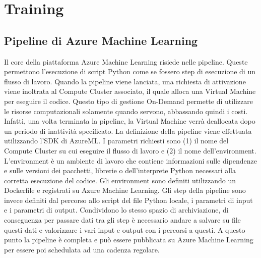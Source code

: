 \section{Training}
\subsection{Pipeline di Azure Machine Learning}
Il core della piattaforma Azure Machine Learning risiede nelle pipeline. Queste permettono l'esecuzione di script Python come se fossero step di esecuzione di un flusso di lavoro. Quando la pipeline viene lanciata, una richiesta di attivazione viene inoltrata al Compute Cluster associato, il quale alloca una Virtual Machine per eseguire il codice. Questo tipo di gestione On-Demand permette di utilizzare le risorse computazionali solamente quando servono, abbassando quindi i costi. Infatti, una volta terminata la pipeline, la Virtual Machine verrà deallocata dopo un periodo di inattività specificato.
La definizione della pipeline viene effettuata utilizzando l'SDK di AzureML. 
I parametri richiesti sono (1) il nome del Compute Cluster su cui eseguire il flusso di lavoro e (2) il nome dell'environment. L'environment è un ambiente di lavoro che contiene informazioni sulle dipendenze e sulle versioni dei pacchetti, librerie o dell'interprete Python necessari alla corretta esecuzione del codice. Gli environment sono definiti utilizzando un Dockerfile e registrati su Azure Machine Learning.
Gli step della pipeline sono invece definiti dal percorso allo script del file Python locale, i parametri di input e i parametri di output. Condividono lo stesso spazio di archiviazione, di conseguenza per passare dati tra gli step è necessario andare a salvare su file questi dati e valorizzare i vari input e output con i percorsi a questi.
A questo punto la pipeline è completa e può essere pubblicata su Azure Machine Learning per essere poi schedulata ad una cadenza regolare.

